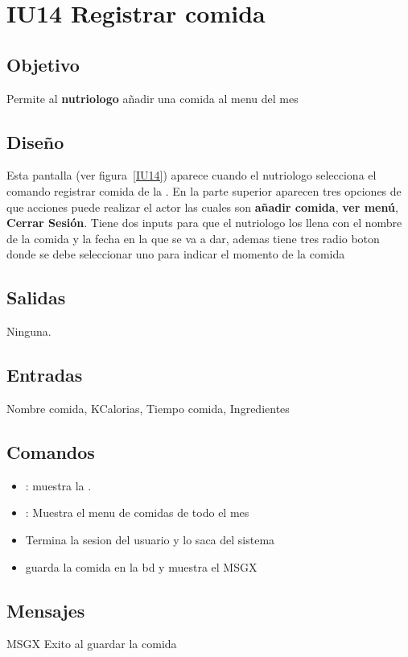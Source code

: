 \newpage
\section{IU14 Registrar comida}

\subsection{Objetivo}
	Permite al {\bf nutriologo} añadir una comida al menu del mes

\subsection{Diseño}
	Esta pantalla  (ver figura~\ref{IU14}) aparece cuando el nutriologo selecciona el comando registrar comida de la . 
 En la parte superior aparecen tres opciones de que acciones puede realizar el actor las cuales son {\bf añadir comida}, {\bf ver menú}, {\bf Cerrar Sesión}. 
Tiene dos inputs para que el nutriologo los llena con el nombre de la comida y la fecha en la que se va a dar, ademas tiene tres radio boton donde se debe seleccionar uno para indicar el momento de la comida
 

\subsection{Salidas}

	Ninguna.

\subsection{Entradas}
Nombre comida, KCalorias, Tiempo comida, Ingredientes

\subsection{Comandos}
\begin{itemize}
	\item {}: muestra la .
	\item {}: Muestra el menu de comidas de todo el mes
        \item {}Termina la sesion del usuario y lo saca del sistema
        \item {} guarda la comida en la bd y muestra el MSGX
\end{itemize}

\subsection{Mensajes}

\begin{Citemize}
	\item MSGX Exito al guardar la comida
\end{Citemize}

